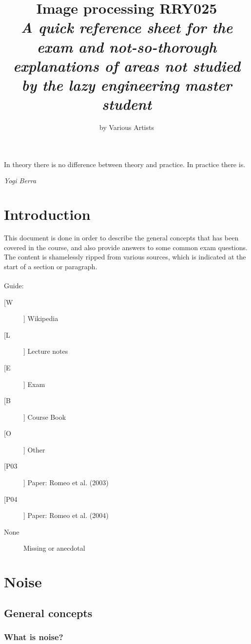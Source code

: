 \documentclass[12pt]{article}
\title{\textbf{Image processing RRY025}\\ \textit{A quick reference sheet for the exam and not-so-thorough explanations
of areas not studied by the lazy engineering master student}}
\author{by Various Artists}
\newenvironment{dedication}
        {\vspace*{6ex}\begin{quotation}\begin{center}\begin{em}}
        {\par\end{em}\end{center}\end{quotation}}
\begin{document}
\maketitle
\epigraph{In theory there is no difference between theory and practice. In practice there is.}{\textit{Yogi Berra}}
\newpage
\begin{dedication}
\hspace{4cm}
\vspace*{9cm}{This paper is dedicated to nobody.}
\end{dedication}
\newpage
\tableofcontents
\newpage

\section{Introduction}
	This document is done in order to describe the general concepts
	that has been covered in the course, and also provide answers to
	some common exam questions. The content is shamelessly ripped from
	various sources, which is indicated at the start of a section
	or paragraph.\\
	\\	
	Guide:
	\begin{description}
		\item[[W]] Wikipedia
		\item[[L]] Lecture notes
		\item[[E]] Exam
		\item[[B]] Course Book
		\item[[O]] Other
		\item[[P03]] Paper: Romeo et al. (2003)
        \item[[P04]] Paper: Romeo et al. (2004) 
		\item[None] Missing or anecdotal
	\end{description}
    	
\newpage
%	
%
\section{Noise}
	\subsection{General concepts}
	\subsubsection{What is noise?}
	
\end{document}
